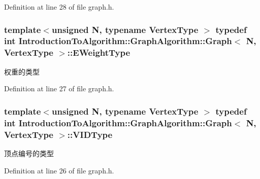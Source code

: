 Definition at line 28 of file graph.\+h.

\hypertarget{struct_introduction_to_algorithm_1_1_graph_algorithm_1_1_graph_ab398c44ce5ea13c66b38edfcbdd2cdc3}{}
\subsubsection[{E\+Weight\+Type}]{\setlength{\rightskip}{0pt plus 5cm}template$<$unsigned N, typename Vertex\+Type $>$ typedef int {\bf Introduction\+To\+Algorithm\+::\+Graph\+Algorithm\+::\+Graph}$<$ N, Vertex\+Type $>$\+::{\bf E\+Weight\+Type}}\label{struct_introduction_to_algorithm_1_1_graph_algorithm_1_1_graph_ab398c44ce5ea13c66b38edfcbdd2cdc3}
权重的类型 

Definition at line 27 of file graph.\+h.

\hypertarget{struct_introduction_to_algorithm_1_1_graph_algorithm_1_1_graph_a60819f2040f2ac261a680db30b0f4409}{}
\subsubsection[{V\+I\+D\+Type}]{\setlength{\rightskip}{0pt plus 5cm}template$<$unsigned N, typename Vertex\+Type $>$ typedef int {\bf Introduction\+To\+Algorithm\+::\+Graph\+Algorithm\+::\+Graph}$<$ N, Vertex\+Type $>$\+::{\bf V\+I\+D\+Type}}\label{struct_introduction_to_algorithm_1_1_graph_algorithm_1_1_graph_a60819f2040f2ac261a680db30b0f4409}
顶点编号的类型 

Definition at line 26 of file graph.\+h.

\hypertarget{struct_introduction_to_algorithm_1_1_graph_algorithm_1_1_graph_a6f480ce7febd625eab0d8600310bae73}{}
